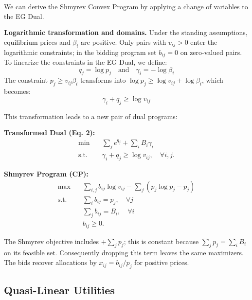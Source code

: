 \documentclass[11pt, a4paper]{article}
\begin{document}
We can derive the Shmyrev Convex Program by applying a change of variables to the EG Dual.

\begin{interpretation}
    \textbf{Logarithmic transformation and domains.} Under the standing assumptions, equilibrium prices and $\beta_i$ are positive. Only pairs with $v_{ij}>0$ enter the logarithmic constraints; in the bidding program set $b_{ij}=0$ on zero-valued pairs.
    To linearize the constraints in the EG Dual, we define:
    \[ q_j = \log p_j \quad \text{and} \quad \gamma_i = -\log \beta_i \]
    The constraint $p_j \geq v_{ij} \beta_i$ transforms into $\log p_j \geq \log v_{ij} + \log \beta_i$, which becomes:
    \[ \gamma_i + q_j \geq \log v_{ij} \]
\end{interpretation}
\noindent This transformation leads to a new pair of dual programs:

\noindent
\begin{minipage}[t]{0.48\textwidth}
    \textbf{Transformed Dual (Eq. 2):}
    \begin{align*}
        \min \quad & \sum_{j} e^{q_j} + \sum_{i} B_i \gamma_i \\
        \text{s.t.} \quad & \gamma_i + q_j \geq \log v_{ij}, \quad \forall i, j.
    \end{align*}
\end{minipage}
\hfill \vrule{} \hfill
\begin{minipage}[t]{0.48\textwidth}
    \textbf{Shmyrev Program (CP):}
    \begin{align*}
        \max \quad & \sum_{i,j} b_{ij} \log v_{ij} - \sum_{j} (p_j \log p_j - p_j) \\
        \text{s.t.} \quad & \sum_{i} b_{ij} = p_j, \quad \forall j \\
        & \sum_{j} b_{ij} = B_i, \quad \forall i \\
        & b_{ij} \geq 0.
    \end{align*}
\end{minipage}

\vspace{1em}
\noindent The Shmyrev objective includes $+\sum_jp_j$; this is constant because $\sum_jp_j=\sum_iB_i$ on its feasible set. Consequently dropping this term leaves the same maximizers. The bids recover allocations by $x_{ij}=b_{ij}/p_j$ for positive prices.

\subsection{Quasi-Linear Utilities}
\end{document}
